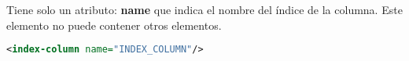 Tiene solo un atributo: {\bf name} que indica el nombre del índice de la columna. Este elemento no puede contener otros elementos.

\begin{lstlisting}[language=xml]
<index-column name="INDEX_COLUMN"/>
\end{lstlisting}